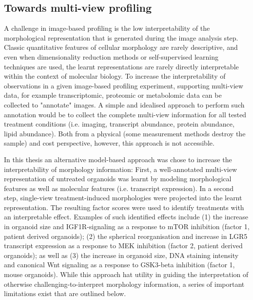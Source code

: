 \begin{flushleft}
\subsection{Towards multi-view profiling}
A challenge in image-based profiling is the low interpretability of the morphological representation that is generated during the image analysis step. Classic quantitative features of cellular morphology are rarely descriptive, and even when dimensionality reduction methods or self-supervised learning techniques are used, the learnt representations are rarely directly interpretable within the context of molecular biology. To increase the interpretability of observations in a given image-based profiling experiment, supporting multi-view data, for example transcriptomic, proteomic or metabolomic data can be collected to "annotate" images. A simple and idealised approach to perform such annotation would be to collect the complete multi-view information for all tested treatment conditions (i.e. imaging, transcript abundance, protein abundance, lipid abundance). Both from a physical (some measurement methods destroy the sample) and cost perspective, however, this approach is not accessible. 
\par

In this thesis an alternative model-based approach was chose to increase the interpretability of morphology information: First, a well-annotated multi-view representation of untreated organoids was learnt by modeling morphological features as well as molecular features (i.e. transcript expression). In a second step, single-view treatment-induced morphologies were projected into the learnt representation. The resulting factor scores were used to identify treatments with an interpretable effect. Examples of such identified effects include (1) the increase in organoid size and IGF1R-signaling as a response to mTOR inhibition (factor 1, patient derived organoids); (2) the spherical reorganisation and increase in LGR5 transcript expression as a response to MEK inhibition (factor 2, patient derived organoids); as well as (3) the increase in organoid size, DNA staining intensity and canonical Wnt signaling as a response to GSK3-beta inhibition (factor 1, mouse organoids). While this approach hat utility in guiding the interpretation of otherwise challenging-to-interpret morphology information, a series of important limitations exist that are outlined below.
\par


\end{flushleft}
